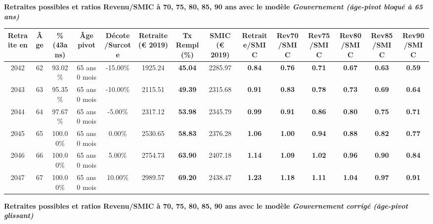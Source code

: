 {\bf \noindent Retraites possibles et ratios Revenu/SMIC à 70, 75, 80, 85, 90 ans avec le modèle \emph{Gouvernement (âge-pivot bloqué à 65 ans)}}  
 
\begin{adjustbox}{max width=\textwidth} 
\begin{tabular}[htb]{|c|c||c|c|c||c|c||c||c|c|c|c|c|c|} 
\hline 
 Retraite en &  Âge &  \%(43ans) &  Âge pivot &  Décote/Surcote &  Retraite (\euro{} 2019) &  Tx Rempl(\%) &  SMIC (\euro{} 2019) &  Retraite/SMIC &  Rev70/SMIC &  Rev75/SMIC &  Rev80/SMIC &  Rev85/SMIC &  Rev90/SMIC \\ 
\hline \hline 
 2042 &  62 &  93.02\% &  65 ans 0 mois &  -15.00\% &  1925.24 &  {\bf 45.04} &  2285.97 &  {\bf {\color{red} 0.84}} &  {\bf {\color{red} 0.76}} &  {\bf {\color{red} 0.71}} &  {\bf {\color{red} 0.67}} &  {\bf {\color{red} 0.63}} &  {\bf {\color{red} 0.59}} \\ 
\hline 
 2043 &  63 &  95.35\% &  65 ans 0 mois &  -10.00\% &  2115.51 &  {\bf 49.39} &  2315.68 &  {\bf {\color{red} 0.91}} &  {\bf {\color{red} 0.83}} &  {\bf {\color{red} 0.78}} &  {\bf {\color{red} 0.73}} &  {\bf {\color{red} 0.69}} &  {\bf {\color{red} 0.64}} \\ 
\hline 
 2044 &  64 &  97.67\% &  65 ans 0 mois &  -5.00\% &  2317.12 &  {\bf 53.98} &  2345.79 &  {\bf {\color{red} 0.99}} &  {\bf {\color{red} 0.91}} &  {\bf {\color{red} 0.86}} &  {\bf {\color{red} 0.80}} &  {\bf {\color{red} 0.75}} &  {\bf {\color{red} 0.71}} \\ 
\hline 
 2045 &  65 &  100.00\% &  65 ans 0 mois &  0.00\% &  2530.65 &  {\bf 58.83} &  2376.28 &  {\bf 1.06} &  {\bf {\color{red} 1.00}} &  {\bf {\color{red} 0.94}} &  {\bf {\color{red} 0.88}} &  {\bf {\color{red} 0.82}} &  {\bf {\color{red} 0.77}} \\ 
\hline 
 2046 &  66 &  100.00\% &  65 ans 0 mois &  5.00\% &  2754.73 &  {\bf 63.90} &  2407.18 &  {\bf 1.14} &  {\bf 1.09} &  {\bf 1.02} &  {\bf {\color{red} 0.96}} &  {\bf {\color{red} 0.90}} &  {\bf {\color{red} 0.84}} \\ 
\hline 
 2047 &  67 &  100.00\% &  65 ans 0 mois &  10.00\% &  2989.57 &  {\bf 69.20} &  2438.47 &  {\bf 1.23} &  {\bf 1.18} &  {\bf 1.11} &  {\bf 1.04} &  {\bf {\color{red} 0.97}} &  {\bf {\color{red} 0.91}} \\ 
\hline 
\hline 
\end{tabular} 
\end{adjustbox} 
 
 \vspace{0.1cm} 
{\bf \noindent Retraites possibles et ratios Revenu/SMIC à 70, 75, 80, 85, 90 ans avec le modèle \emph{Gouvernement corrigé (âge-pivot glissant)}}  
 
